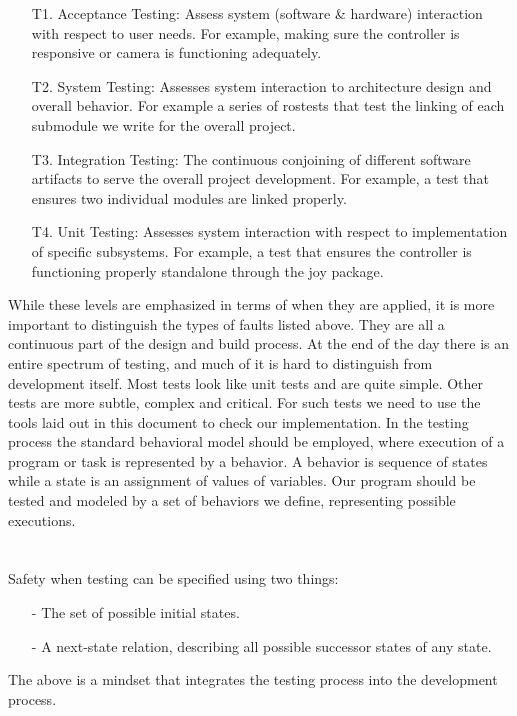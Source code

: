 \documentclass[english,12pt]{article}
\begin{document}
\begin{itemize}
    \item[T1.] Acceptance Testing: Assess system (software \& hardware) interaction with respect 
    to user needs. For example, making sure the controller is responsive or camera is functioning 
    adequately.
    \item[T2.] System Testing: Assesses system interaction to architecture design and overall behavior. 
    For example a series of rostests that test the linking of each submodule we write for the overall 
    project.
    \item[T3.] Integration Testing: The continuous conjoining of different software artifacts to 
    serve the overall project development. For example, a test that ensures two individual modules are 
    linked properly.
    \item[T4.] Unit Testing: Assesses system interaction with respect to implementation of specific subsystems. 
    For example, a test that ensures the controller is functioning properly standalone through the joy 
    package.
\end{itemize}
While these levels are emphasized in terms of when they are applied, it is more important to distinguish 
the types of faults listed above. They are all a continuous part of the design and build process. At 
the end of the day there is an entire spectrum of testing, and much of it is hard to distinguish from 
development itself. Most tests look like unit tests and are quite simple. Other tests are more subtle, 
complex and critical. For such tests we need to use the tools laid out in this document to check our 
implementation. In the testing process the standard behavioral model should be employed, where 
execution of a program or task is represented by a behavior. A behavior is sequence of states while a state 
is an assignment of values of variables. Our program should be tested and modeled by a set of behaviors 
we define, representing possible executions. \\\\\\
Safety when testing can be specified using two things:\\
\begin{itemize}
    \item[-] The set of possible initial states.
    \item[-] A next-state relation, describing all possible successor states of any state. 
\end{itemize}
The above is a mindset that integrates the testing process into the development process.\\\\\\
\end{document}
